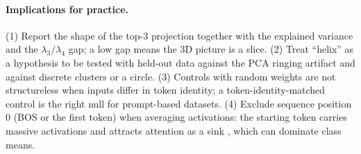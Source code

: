 \paragraph{Implications for practice.} (1) Report the shape of the top-3 projection together with the explained variance and the $\lambda_3/\lambda_4$ gap; a low gap means the 3D picture is a slice. (2) Treat ``helix'' as a hypothesis to be tested with held-out data against the PCA ringing artifact \citep{novembre2008horseshoe,antognini2018walks,shinn2023phantom} and against discrete clusters or a circle. (3) Controls with random weights are not structureless when inputs differ in token identity; a token-identity-matched control is the right null for prompt-based datasets. (4) Exclude sequence position 0 (BOS or the first token) when averaging activations: the starting token carries massive activations and attracts attention as a sink \citep{sun2024massive,xiao2024sinks}, which can dominate class means.

